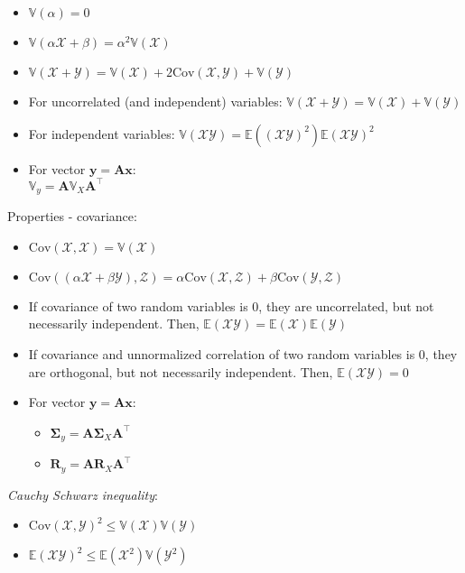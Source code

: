 \begin{multicols}{2}
\begin{itemize}
    \item $\mathbb{V}(\alpha)=0$
    \item $\mathbb{V}(\alpha\mathcal{X}+\beta)=\alpha^2\mathbb{V}(\mathcal{X})$
    \item $\mathbb{V}(\mathcal{X} + \mathcal{Y})=\mathbb{V}(\mathcal{X})+2\textrm{Cov}(\mathcal{X},\mathcal{Y})+\mathbb{V}(\mathcal{Y})$
    \item For uncorrelated (and independent) variables: $\mathbb{V}(\mathcal{X} + \mathcal{Y})=\mathbb{V}(\mathcal{X})+\mathbb{V}(\mathcal{Y})$
    \item For independent variables: $\mathbb{V}(\mathcal{X}\mathcal{Y})=\mathbb{E}((\mathcal{X}\mathcal{Y})^2)\mathbb{E}(\mathcal{X}\mathcal{Y})^2$
    \item For vector $\boldsymbol{y} = \boldsymbol{A}\boldsymbol{x}$:\\ $\mathbb{V}_y = \boldsymbol{A}\mathbb{V}_X\boldsymbol{A}^\intercal$
\end{itemize}
\end{multicols}
Properties - covariance:
\begin{itemize}
    \item $\textrm{Cov}(\mathcal{X},\mathcal{X}) = \mathbb{V}(\mathcal{X})$
    \item $\textrm{Cov}((\alpha \mathcal{X} + \beta \mathcal{Y}),\mathcal{Z}) = \alpha \textrm{Cov}(\mathcal{X},\mathcal{Z}) + \beta \textrm{Cov}(\mathcal{Y},\mathcal{Z})$
    \item If covariance of two random variables is 0, they are uncorrelated, but not necessarily independent. Then, $\mathbb{E}(\mathcal{X}\mathcal{Y})=\mathbb{E}(\mathcal{X})\mathbb{E}(\mathcal{Y})$
    \item If covariance and unnormalized correlation of two random variables is 0, they are orthogonal, but not necessarily independent. Then, $\mathbb{E}(\mathcal{X}\mathcal{Y}) = 0$
    \item For vector $\boldsymbol{y} = \boldsymbol{A}\boldsymbol{x}$:
        \begin{itemize}
            \item $\boldsymbol{\Sigma}_y = \boldsymbol{A}\boldsymbol{\Sigma}_X\boldsymbol{A}^\intercal$
            \item $\boldsymbol{R}_y = \boldsymbol{A}\boldsymbol{R}_X\boldsymbol{A}^\intercal$
        \end{itemize}
\end{itemize}
\emph{Cauchy Schwarz inequality}: \begin{itemize}
    \item $\textrm{Cov}(\mathcal{X},\mathcal{Y})^2 \leq \mathbb{V}(\mathcal{X})\mathbb{V}(\mathcal{Y})$
    \item $\mathbb{E}(\mathcal{X}\mathcal{Y})^2 \leq \mathbb{E}(\mathcal{X}^2)\mathbb{V}(\mathcal{Y}^2)$
\end{itemize}

